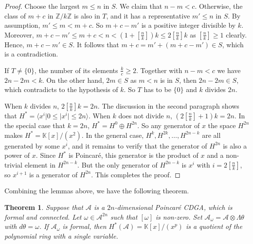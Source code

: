 \documentclass{article}
\theoremstyle{plain}
\newtheorem{thm}{Theorem}[section]
\theoremstyle{definition}
\theoremstyle{plain}
\numberwithin{equation}{section}
\begin{document}
\begin{proof}
Choose the largest $m\leq n$ in $S$. We claim that $n-m<c$. Otherwise, the class of $m+c$ in $\mathbb{Z}/k\mathbb{Z}$ is also in $T$, and it has a representative $m'\leq n$ in $S$. By assumption, $m'\leq m<m+c$. So $m+c-m'$ is a positive integer divisible by $k$. Moreover, $m+c-m'\leq m+c<n< (1+[\frac{n}{k}])k\leq 2[\frac{n}{k}]k$ as $[\frac{n}{k}]\geq 1$ clearly. Hence, $m+c-m'\in S$. It follows that $m+c=m'+(m+c-m')\in S$, which is a contradiction.

If $T\neq\{0\}$, the number of its elements $\frac{k}{c}\geq 2$. Together with $n-m<c$ we have $2n-2m<k$. On the other hand, $2m\in S$ as $m<n$ is in $S$, then $2n-2m\in S$, which contradicts to the hypothesis of $k$. So $T$ has to be $\{0\}$ and $k$ divides $2n$.

When $k$ divides $n$, $2[\frac{n}{k}]k=2n$. The discussion in the second paragraph shows that $H^*=\langle x^i| 0\leq|x^i|\leq 2n\rangle$. When $k$ does not divide $n$, $(2[\frac{n}{k}]+1)k=2n$. In the special case that $k=2n$, $H^*=H^0\oplus H^{2n}$. So any generator of $x$ the space $H^{2n}$ makes $H^*=\mathbb{K}[x]/(x^2)$. In the general case, $H^k,H^{2k},\ldots,H^{2n-k}$ are all generated by some $x^i$, and it remains to verify that the generator of $H^{2n}$ is also a power of $x$. Since $H^*$ is Poincar\'e, this generator is the product of $x$ and a non-trivial element in $H^{2n-k}$. But the only generator of $H^{2n-k}$ is $x^i$ with $i=2[\frac{n}{k}]$, so $x^{i+1}$ is a generator of $H^{2n}$. This completes the proof.
\end{proof}

Combining the lemmas above, we have the following theorem.

\begin{thm}\label{formality of extended by top degree}
Suppose that $\mathcal{A}$ is a $2n$-dimensional Poincar\'e CDGA, which is formal and connected. Let $\omega\in\mathcal{A}^{2n}$ such that $[\omega]$ is non-zero. Set $\mathcal{A}_{\omega}=\mathcal{A}\otimes\Lambda\theta$ with $d\theta=\omega$. If $\mathcal{A}_{\omega}$ is formal, then $H^*(\mathcal{A})=\mathbb{K}[x]/(x^p)$ is a quotient of the polynomial ring with a single variable.
\end{thm}
\end{document}
